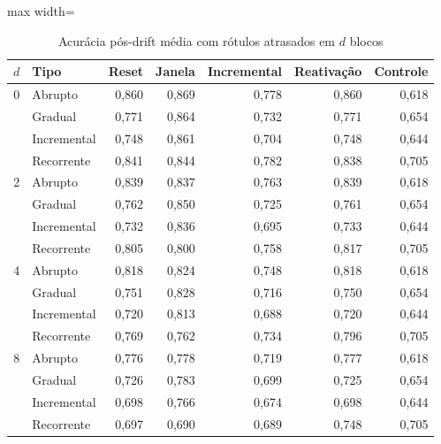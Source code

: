 \begin{table}[htbp]
\centering
\small
\caption{Acurácia pós-drift média com rótulos atrasados em $d$ blocos}
\label{tab:atraso}
\begin{adjustbox}{max width=\textwidth}
\begin{tabular}{clrrrrr}
\toprule
$d$ & Tipo & Reset & Janela & Incremental & Reativação & Controle \\
\midrule
0 & Abrupto & 0,860 & 0,869 & 0,778 & 0,860 & 0,618 \\
 & Gradual & 0,771 & 0,864 & 0,732 & 0,771 & 0,654 \\
 & Incremental & 0,748 & 0,861 & 0,704 & 0,748 & 0,644 \\
 & Recorrente & 0,841 & 0,844 & 0,782 & 0,838 & 0,705 \\
2 & Abrupto & 0,839 & 0,837 & 0,763 & 0,839 & 0,618 \\
 & Gradual & 0,762 & 0,850 & 0,725 & 0,761 & 0,654 \\
 & Incremental & 0,732 & 0,836 & 0,695 & 0,733 & 0,644 \\
 & Recorrente & 0,805 & 0,800 & 0,758 & 0,817 & 0,705 \\
4 & Abrupto & 0,818 & 0,824 & 0,748 & 0,818 & 0,618 \\
 & Gradual & 0,751 & 0,828 & 0,716 & 0,750 & 0,654 \\
 & Incremental & 0,720 & 0,813 & 0,688 & 0,720 & 0,644 \\
 & Recorrente & 0,769 & 0,762 & 0,734 & 0,796 & 0,705 \\
8 & Abrupto & 0,776 & 0,778 & 0,719 & 0,777 & 0,618 \\
 & Gradual & 0,726 & 0,783 & 0,699 & 0,725 & 0,654 \\
 & Incremental & 0,698 & 0,766 & 0,674 & 0,698 & 0,644 \\
 & Recorrente & 0,697 & 0,690 & 0,689 & 0,748 & 0,705 \\
\bottomrule
\end{tabular}
\end{adjustbox}
\par\vspace{2pt}{\footnotesize Médias sobre severidades, classificadores e 10 repetições, com janela de treino de um bloco. $d$ = 0 corresponde ao fatorial principal.}
\end{table}
